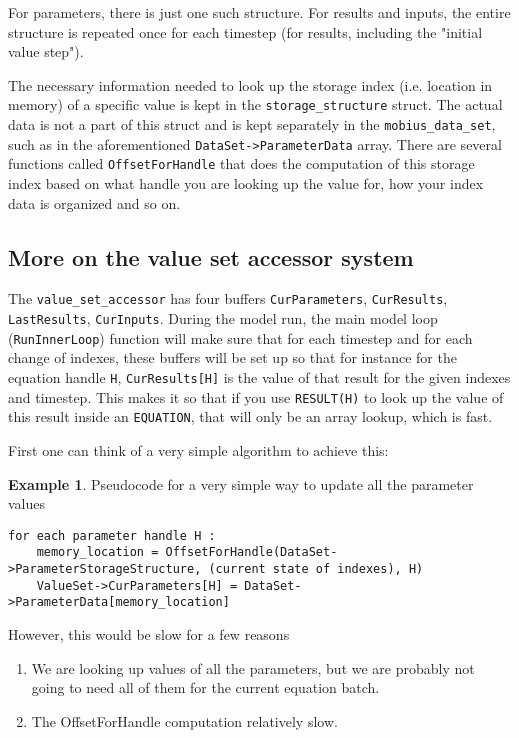 \documentclass[11pt]{article}
\theoremstyle{definition}
\newtheorem{myexample}{Example}
\newenvironment{example}%
  {\begin{lrbox}{\examplebox}%
   \begin{minipage}{\dimexpr\linewidth-2\fboxsep}
   \begin{myexample}}%
  {\end{myexample}%
   \end{minipage}%
   \end{lrbox}%
   \begin{trivlist}
     \item[]\colorbox{silver}{\usebox\examplebox}
   \end{trivlist}}
\begin{document}
For parameters, there is just one such structure. For results and inputs, the entire structure is repeated once for each timestep (for results, including the "initial value step").

The necessary information needed to look up the storage index (i.e. location in memory) of a specific value is kept in the {\tt storage\_structure} struct. The actual data is not a part of this struct and is kept separately in the {\tt mobius\_data\_set}, such as in the aforementioned {\tt DataSet->ParameterData} array. There are several functions called {\tt OffsetForHandle} that does the computation of this storage index based on what handle you are looking up the value for, how your index data is organized and so on.


\subsection{More on the value set accessor system}

The {\tt value\_set\_accessor} has four buffers {\tt CurParameters}, {\tt CurResults}, {\tt LastResults}, {\tt CurInputs}. During the model run, the main model loop ({\tt RunInnerLoop}) function will make sure that for each timestep and for each change of indexes, these buffers will be set up so that for instance for the equation handle {\tt H}, {\tt CurResults[H]} is the value of that result for the given indexes and timestep. This makes it so that if you use {\tt RESULT(H)} to look up the value of this result inside an {\tt EQUATION}, that will only be an array lookup, which is fast.

First one can think of a very simple algorithm to achieve this:
\begin{example}
Pseudocode for a very simple way to update all the parameter values
\begin{lstlisting}[style = mycpp]
for each parameter handle H :
	memory_location = OffsetForHandle(DataSet->ParameterStorageStructure, (current state of indexes), H)
	ValueSet->CurParameters[H] = DataSet->ParameterData[memory_location]
\end{lstlisting}
\end{example}

However, this would be slow for a few reasons
\begin{enumerate}[i]
\item We are looking up values of all the parameters, but we are probably not going to need all of them for the current equation batch.
\item The OffsetForHandle computation relatively slow.
\end{enumerate}
\end{document}

